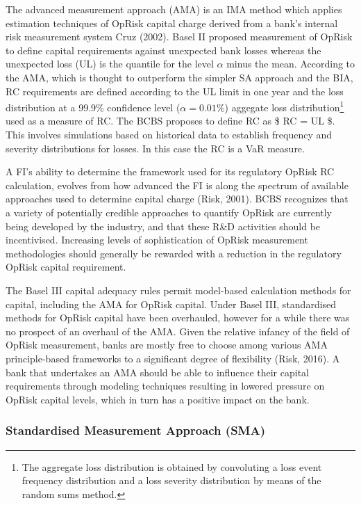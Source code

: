 \documentclass[]{DissertateUSU}
\let\rmarkdownfootnote\footnote%
\def\footnote{\protect\rmarkdownfootnote}
\begin{document}
The advanced measurement approach (AMA) is an IMA method which applies
estimation techniques of OpRisk capital charge derived from a bank's
internal risk measurement system Cruz (2002). Basel II proposed
measurement of OpRisk to define capital requirements against unexpected
bank losses whereas the unexpected loss (UL) is the quantile for the
level \(\alpha\) minus the mean. According to the AMA, which is thought
to outperform the simpler SA approach and the BIA, RC requirements are
defined according to the UL limit in one year and the loss distribution
at a 99.9\% confidence level (\(\alpha = 0.01\%\)) aggegate loss
distribution\footnote{The aggregate loss distribution is obtained by convoluting a loss event frequency distribution and a loss severity distribution by means of the random sums method.}
used as a measure of RC. The BCBS proposes to define RC as \$ RC = UL
\$. This involves simulations based on historical data to establish
frequency and severity distributions for losses. In this case the RC is
a VaR measure.\medskip

A FI's ability to determine the framework used for its regulatory OpRisk
RC calculation, evolves from how advanced the FI is along the spectrum
of available approaches used to determine capital charge (Risk, 2001).
BCBS recognizes that a variety of potentially credible approaches to
quantify OpRisk are currently being developed by the industry, and that
these R\&D activities should be incentivised. Increasing levels of
sophistication of OpRisk measurement methodologies should generally be
rewarded with a reduction in the regulatory OpRisk capital
requirement.\medskip

The Basel III capital adequacy rules permit model-based calculation
methods for capital, including the AMA for OpRisk capital. Under Basel
III, standardised methods for OpRisk capital have been overhauled,
however for a while there was no prospect of an overhaul of the AMA.
Given the relative infancy of the field of OpRisk measurement, banks are
mostly free to choose among various AMA principle-based frameworks to a
significant degree of flexibility (Risk, 2016). A bank that undertakes
an AMA should be able to influence their capital requirements through
modeling techniques resulting in lowered pressure on OpRisk capital
levels, which in turn has a positive impact on the bank.\medskip 

\subsubsection{Standardised Measurement Approach (SMA)}
\end{document}
